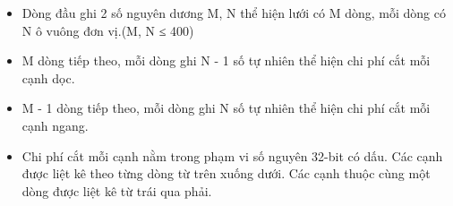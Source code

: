 \begin{itemize}
	\item Dòng đầu ghi 2 số nguyên dương M, N thể hiện lưới có M dòng, mỗi dòng có N ô vuông đơn vị.(M, N ≤ 400)
	\item M dòng tiếp theo, mỗi dòng ghi N - 1 số tự nhiên thể hiện chi phí cắt mỗi cạnh dọc.
	\item M - 1 dòng tiếp theo, mỗi dòng ghi N số tự nhiên thể hiện chi phí cắt mỗi cạnh ngang.
	\item Chi phí cắt mỗi cạnh nằm trong phạm vi số nguyên 32-bit có dấu. Các cạnh được liệt kê theo từng dòng từ trên xuống dưới. Các cạnh thuộc cùng một dòng được liệt kê từ trái qua phải.
\end{itemize}